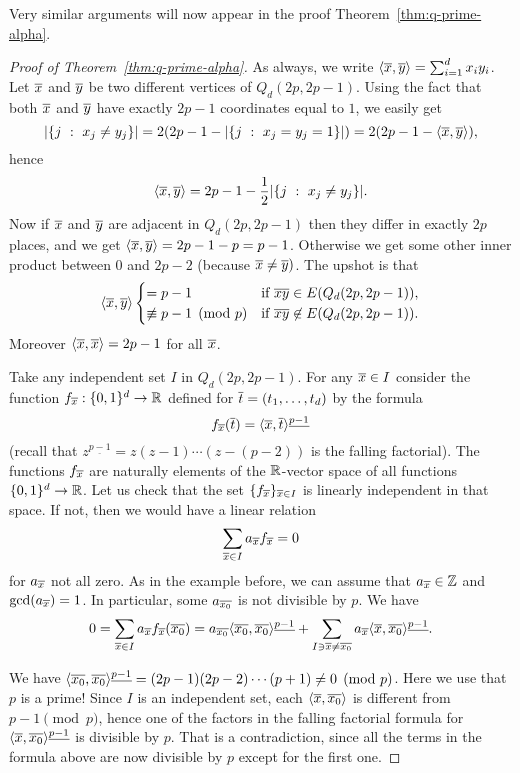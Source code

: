 Very similar arguments will now appear in the proof Theorem~\ref{thm:q-prime-alpha}.

\begin{proof}[Proof of Theorem~\ref{thm:q-prime-alpha}]
As always, we write $\langle \overline{x},\overline{y}\rangle=\sum_{i=1}^dx_iy_i$. Let $\overline{x}$ and $\overline{y}$ be two different vertices of $Q_d(2p,2p-1)$. Using the fact that both $\overline{x}$ and $\overline{y}$ have exactly $2p-1$ coordinates equal to $1$, we easily get 
$$|\{j~:~x_j\neq y_j\}|=2(2p-1-|\{j~:~x_j=y_j=1\}|)=2(2p-1-\langle\overline{x},\overline{y}\rangle),$$
hence
$$\langle \overline{x},\overline{y}\rangle=2p-1-\frac12|\{j~:~x_j\neq y_j\}|.$$
Now if $\overline{x}$ and $\overline{y}$ are adjacent in $Q_d(2p,2p-1)$ then they differ in exactly $2p$ places, and we get $\langle\overline{x},\overline{y}\rangle=2p-1-p=p-1$. Otherwise we get some other inner product between $0$ and $2p-2$ (because $\overline{x}\neq\overline{y})$. The upshot is that
$$
\langle\overline{x},\overline{y}\rangle
\begin{cases}
=p-1 & \textrm{if}\ \overline{x}\overline{y}\in E(Q_d(2p,2p-1)),\\
\not\equiv p-1 \pmod{p} &  \textrm{if}\ \overline{x}\overline{y}\not\in E(Q_d(2p,2p-1)).
\end{cases}
$$
Moreover $\langle \overline{x},\overline{x}\rangle=2p-1$ for all $\overline{x}$.

\smallskip
Take any independent set $I$ in $Q_d(2p,2p-1)$. For any $\overline{x}\in I$ consider the function $f_{\overline{x}}:\{0,1\}^d\to\mathbb{R}$ defined for $\overline{t}=(t_1,\ldots,t_d)$ by the formula
$$f_{\overline{x}}(\overline{t}) = \langle\overline{x},\overline{t}\rangle^{\underline{p-1}}$$
(recall that $z^{\underline{p-1}}=z(z-1)\cdots(z-(p-2))$ is the falling factorial).
The functions $f_{\overline{x}}$ are naturally elements of the $\mathbb{R}$-vector space of all functions $\{0,1\}^d\to\mathbb{R}$. Let us check that the set $\{f_{\overline{x}}\}_{\overline{x}\in I}$ is linearly independent in that space. If not, then we would have a linear relation
$$\sum_{\overline{x}\in I}a_{\overline{x}}f_{\overline{x}}=0$$
for $a_{\overline{x}}$ not all zero. As in the example before, we can assume that $a_{\overline{x}}\in\mathbb{Z}$ and $\textrm{gcd}(a_{\overline{x}})=1$. In particular, some $a_{\overline{x_0}}$ is not divisible by $p$. We have
$$0=\sum_{\overline{x}\in I}a_{\overline{x}}f_{\overline{x}}(\overline{x_0})=
a_{\overline{x_0}}\langle\overline{x_0},\overline{x_0}\rangle^{\underline{p-1}}+
\sum_{I\ni \overline{x}\neq\overline{x_0}}a_{\overline{x}}\langle\overline{x},\overline{x_0}\rangle^{\underline{p-1}}.
$$

We have $\langle\overline{x_0},\overline{x_0}\rangle^{\underline{p-1}}=(2p-1)(2p-2)\cdots(p+1)\neq 0 \pmod{p}$. Here we use that $p$ is a prime! Since $I$ is an independent set, each $\langle\overline{x},\overline{x_0}\rangle$ is different from $p-1 \pmod{p}$, hence one of the factors in the falling factorial formula for $\langle\overline{x},\overline{x_0}\rangle^{\underline{p-1}}$ is divisible by $p$. That is a contradiction, since all the terms in the formula above are now divisible by $p$ except for the first one.


\end{proof}
